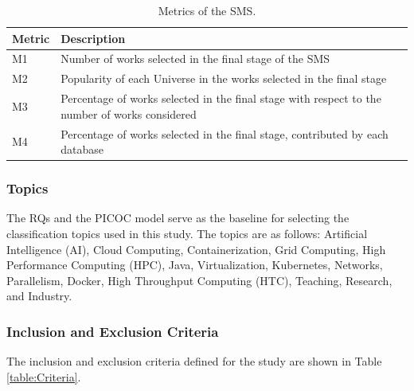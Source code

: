 \begin{table}[ht]
\renewcommand{\arraystretch}{1.3}
    \centering
	\caption{Metrics of the SMS.}
    \begin{tabular}{p{1cm}p{5.8cm}}
        \hline
        \textbf{Metric} & \textbf{Description} \\
        \hline
        M1     & Number of works selected in the final stage of the SMS \\
        M2     & Popularity of each Universe in the works selected in the final stage \\
        M3     & Percentage of works selected in the final stage with respect to the number of works considered \\
        M4     & Percentage of works selected in the final stage, contributed by each database \\
        \hline
    \end{tabular}
	\label{table:Metrics}
\end{table}

\subsubsection{Topics}
The RQs and the PICOC model serve as the baseline for selecting the classification topics used in this study. The topics are as follows: Artificial Intelligence (AI), Cloud Computing, Containerization, Grid Computing, High Performance Computing (HPC), Java, Virtualization, Kubernetes, Networks, Parallelism, Docker, High Throughput Computing (HTC), Teaching, Research, and Industry.

\subsubsection{Inclusion and Exclusion Criteria}
The inclusion and exclusion criteria defined for the study are shown in Table \ref{table:Criteria}.

